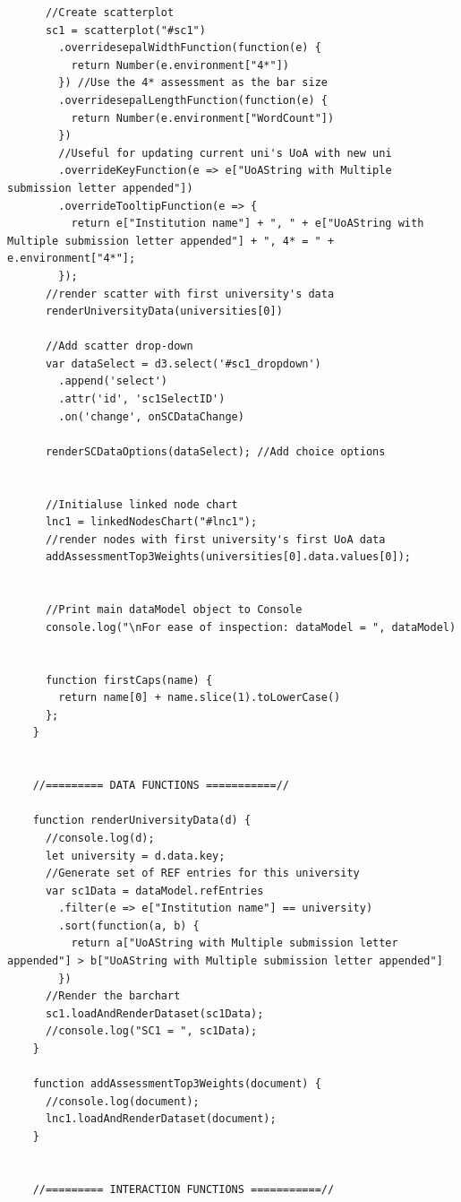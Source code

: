 \documentclass[a4paper, 11pt]{article}
\begin{document}
\begin{verbatim}
      //Create scatterplot
      sc1 = scatterplot("#sc1")
        .overridesepalWidthFunction(function(e) {
          return Number(e.environment["4*"])
        }) //Use the 4* assessment as the bar size
        .overridesepalLengthFunction(function(e) {
          return Number(e.environment["WordCount"])
        })
        //Useful for updating current uni's UoA with new uni
        .overrideKeyFunction(e => e["UoAString with Multiple submission letter appended"])
        .overrideTooltipFunction(e => {
          return e["Institution name"] + ", " + e["UoAString with Multiple submission letter appended"] + ", 4* = " + e.environment["4*"];
        });
      //render scatter with first university's data
      renderUniversityData(universities[0])

      //Add scatter drop-down
      var dataSelect = d3.select('#sc1_dropdown')
        .append('select')
        .attr('id', 'sc1SelectID')
        .on('change', onSCDataChange)

      renderSCDataOptions(dataSelect); //Add choice options


      //Initialuse linked node chart
      lnc1 = linkedNodesChart("#lnc1");
      //render nodes with first university's first UoA data
      addAssessmentTop3Weights(universities[0].data.values[0]);


      //Print main dataModel object to Console
      console.log("\nFor ease of inspection: dataModel = ", dataModel)


      function firstCaps(name) {
        return name[0] + name.slice(1).toLowerCase()
      };
    }


    //========= DATA FUNCTIONS ===========//

    function renderUniversityData(d) {
      //console.log(d);
      let university = d.data.key;
      //Generate set of REF entries for this university
      var sc1Data = dataModel.refEntries
        .filter(e => e["Institution name"] == university)
        .sort(function(a, b) {
          return a["UoAString with Multiple submission letter appended"] > b["UoAString with Multiple submission letter appended"]
        })
      //Render the barchart
      sc1.loadAndRenderDataset(sc1Data);
      //console.log("SC1 = ", sc1Data);
    }

    function addAssessmentTop3Weights(document) {
      //console.log(document);
      lnc1.loadAndRenderDataset(document);
    }


    //========= INTERACTION FUNCTIONS ===========//


\end{verbatim}
\end{document}
